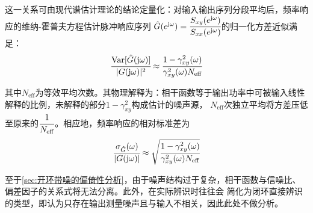 这一关系可由现代谱估计理论的结论定量化\cite{Bendat2010}：对输入输出序列分段平均后，频率响应的维纳-霍普夫方程估计脉冲响应序列
\(\hat{G}(e^{\mathrm{j}\omega})=\cfrac{S_{xy}(e^{\mathrm{j}\omega})}{S_{xx}(e^{\mathrm{j}\omega})}\)的归一化方差近似满足：
\begin{equation*}
    \cfrac{\mathrm{Var}[\hat G(\mathrm{j}\omega)]}{|G(\mathrm{j}\omega)|^2}
    \approx\cfrac{1-\gamma_{xy}^2(\omega)}{\gamma_{xy}^2(\omega)N_{\mathrm{eff}}}
\end{equation*}

其中\(N_{\mathrm{eff}}\)为等效平均次数。其物理解释为：相干函数等于输出功率中可被输入线性解释的比例，未解释的部分\(1-\gamma_{xy}^2\)构成估计的噪声源，
\(N_{\mathrm{eff}}\)次独立平均将方差压低至原来的\(\cfrac{1}{N_{\mathrm{eff}}}\)。相应地，频率响应的相对标准差为
\begin{equation}
    \cfrac{\sigma_{\hat G}(\omega)}{|G(\mathrm{j}\omega)|}
    \approx\sqrt{\cfrac{1-\gamma_{xy}^2(\omega)}{\gamma_{xy}^2(\omega)N_{\mathrm{eff}}}}
    \label{eq:估计方差与相干函数}
\end{equation}

至于\ref{sec:开环带噪的偏倚性分析}，由于噪声结构过于复杂，相干函数与信噪比、偏差因子的关系式将无法分离。此外，在实际辨识时往往会
简化为闭环直接辨识的类型，即认为只存在输出测量噪声且与输入不相关，因此此处不做分析。